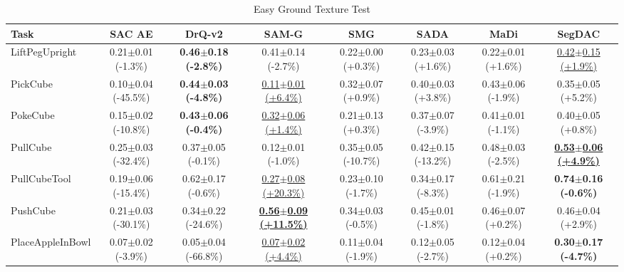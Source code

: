 \begin{table}[htbp]
\centering
\scriptsize
\caption{Easy Ground Texture Test}
\label{tab:appendix_groundtexturetest_easy}
\begin{adjustbox}{max width=\textwidth}
\begin{tabular}{l*{7}{c}}
\toprule
\textbf{Task} & \textbf{SAC AE} & \textbf{DrQ-v2} & \textbf{SAM-G} & \textbf{SMG} & \textbf{SADA} & \textbf{MaDi} & \textbf{SegDAC} \\
\midrule
LiftPegUpright & 0.21$\pm$0.01 \scriptsize{(-1.3\%)} & \textbf{0.46$\pm$0.18 \scriptsize{(-2.8\%)}} & 0.41$\pm$0.14 \scriptsize{(-2.7\%)} & 0.22$\pm$0.00 \scriptsize{(+0.3\%)} & 0.23$\pm$0.03 \scriptsize{(+1.6\%)} & 0.22$\pm$0.01 \scriptsize{(+1.6\%)} & \underline{0.42$\pm$0.15 \scriptsize{(+1.9\%)}} \\
PickCube & 0.10$\pm$0.04 \scriptsize{(-45.5\%)} & \textbf{0.44$\pm$0.03 \scriptsize{(-4.8\%)}} & \underline{0.11$\pm$0.01 \scriptsize{(+6.4\%)}} & 0.32$\pm$0.07 \scriptsize{(+0.9\%)} & 0.40$\pm$0.03 \scriptsize{(+3.8\%)} & 0.43$\pm$0.06 \scriptsize{(-1.9\%)} & 0.35$\pm$0.05 \scriptsize{(+5.2\%)} \\
PokeCube & 0.15$\pm$0.02 \scriptsize{(-10.8\%)} & \textbf{0.43$\pm$0.06 \scriptsize{(-0.4\%)}} & \underline{0.32$\pm$0.06 \scriptsize{(+1.4\%)}} & 0.21$\pm$0.13 \scriptsize{(+0.3\%)} & 0.37$\pm$0.07 \scriptsize{(-3.9\%)} & 0.41$\pm$0.01 \scriptsize{(-1.1\%)} & 0.40$\pm$0.05 \scriptsize{(+0.8\%)} \\
PullCube & 0.25$\pm$0.03 \scriptsize{(-32.4\%)} & 0.37$\pm$0.05 \scriptsize{(-0.1\%)} & 0.12$\pm$0.01 \scriptsize{(-1.0\%)} & 0.35$\pm$0.05 \scriptsize{(-10.7\%)} & 0.42$\pm$0.15 \scriptsize{(-13.2\%)} & 0.48$\pm$0.03 \scriptsize{(-2.5\%)} & \textbf{\underline{0.53$\pm$0.06 \scriptsize{(+4.9\%)}}} \\
PullCubeTool & 0.19$\pm$0.06 \scriptsize{(-15.4\%)} & 0.62$\pm$0.17 \scriptsize{(-0.6\%)} & \underline{0.27$\pm$0.08 \scriptsize{(+20.3\%)}} & 0.23$\pm$0.10 \scriptsize{(-1.7\%)} & 0.34$\pm$0.17 \scriptsize{(-8.3\%)} & 0.61$\pm$0.21 \scriptsize{(-1.9\%)} & \textbf{0.74$\pm$0.16 \scriptsize{(-0.6\%)}} \\
PushCube & 0.21$\pm$0.03 \scriptsize{(-30.1\%)} & 0.34$\pm$0.22 \scriptsize{(-24.6\%)} & \textbf{\underline{0.56$\pm$0.09 \scriptsize{(+11.5\%)}}} & 0.34$\pm$0.03 \scriptsize{(-0.5\%)} & 0.45$\pm$0.01 \scriptsize{(-1.8\%)} & 0.46$\pm$0.07 \scriptsize{(+0.2\%)} & 0.46$\pm$0.04 \scriptsize{(+2.9\%)} \\
PlaceAppleInBowl & 0.07$\pm$0.02 \scriptsize{(-3.9\%)} & 0.05$\pm$0.04 \scriptsize{(-66.8\%)} & \underline{0.07$\pm$0.02 \scriptsize{(+4.4\%)}} & 0.11$\pm$0.04 \scriptsize{(-1.9\%)} & 0.12$\pm$0.05 \scriptsize{(-2.7\%)} & 0.12$\pm$0.04 \scriptsize{(+0.2\%)} & \textbf{0.30$\pm$0.17 \scriptsize{(-4.7\%)}} \\

\end{tabular}
\end{adjustbox}
\end{table}
